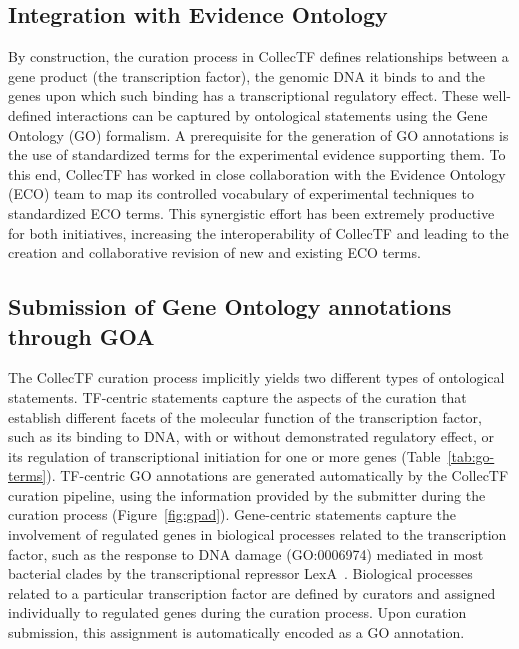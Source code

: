 \subsection{Integration with Evidence Ontology}

By construction, the curation process in CollecTF defines relationships between
a gene product (the transcription factor), the genomic DNA it binds to and the
genes upon which such binding has a transcriptional regulatory effect. These
well-defined interactions can be captured by ontological statements using the
Gene Ontology (GO) formalism. A prerequisite for the generation of GO
annotations is the use of standardized terms for the experimental evidence
supporting them. To this end, CollecTF has worked in close collaboration with
the Evidence Ontology (ECO) team to map its controlled vocabulary of
experimental techniques to standardized ECO terms. This synergistic effort has
been extremely productive for both initiatives, increasing the interoperability
of CollecTF and leading to the creation and collaborative revision of new and
existing ECO terms.

\subsection{Submission of Gene Ontology annotations through GOA}
The CollecTF curation process implicitly yields two different types of
ontological statements. TF-centric statements capture the aspects of the
curation that establish different facets of the molecular function of the
transcription factor, such as its binding to DNA, with or without demonstrated
regulatory effect, or its regulation of transcriptional initiation for one or
more genes (Table~\ref{tab:go-terms}). TF-centric GO annotations are generated
automatically by the CollecTF curation pipeline, using the information provided
by the submitter during the curation process
(Figure~\ref{fig:gpad}). Gene-centric statements capture the involvement of
regulated genes in biological processes related to the transcription factor,
such as the response to DNA damage (GO:0006974) mediated in most bacterial
clades by the transcriptional repressor LexA~\citep{erill2007aeons}. Biological
processes related to a particular transcription factor are defined by curators
and assigned individually to regulated genes during the curation process. Upon
curation submission, this assignment is automatically encoded as a GO
annotation.


